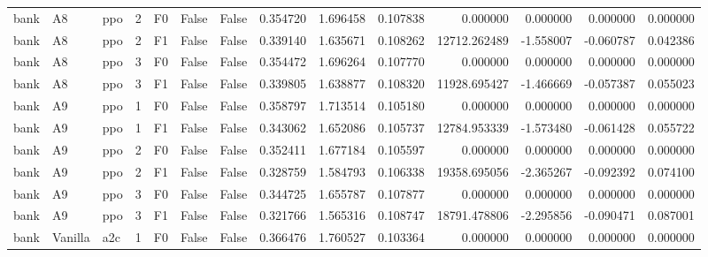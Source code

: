 \begin{tabular}{lllrlllrrrrrrr}
      bank &      A8 &       ppo &     2 &  F0 &           False &            False &  0.354720 &  1.696458 & 0.107838 &         0.000000 &           0.000000 &        0.000000 &            0.000000 \\
      bank &      A8 &       ppo &     2 &  F1 &           False &            False &  0.339140 &  1.635671 & 0.108262 &     12712.262489 &          -1.558007 &       -0.060787 &            0.042386 \\
      bank &      A8 &       ppo &     3 &  F0 &           False &            False &  0.354472 &  1.696264 & 0.107770 &         0.000000 &           0.000000 &        0.000000 &            0.000000 \\
      bank &      A8 &       ppo &     3 &  F1 &           False &            False &  0.339805 &  1.638877 & 0.108320 &     11928.695427 &          -1.466669 &       -0.057387 &            0.055023 \\
      bank &      A9 &       ppo &     1 &  F0 &           False &            False &  0.358797 &  1.713514 & 0.105180 &         0.000000 &           0.000000 &        0.000000 &            0.000000 \\
      bank &      A9 &       ppo &     1 &  F1 &           False &            False &  0.343062 &  1.652086 & 0.105737 &     12784.953339 &          -1.573480 &       -0.061428 &            0.055722 \\
      bank &      A9 &       ppo &     2 &  F0 &           False &            False &  0.352411 &  1.677184 & 0.105597 &         0.000000 &           0.000000 &        0.000000 &            0.000000 \\
      bank &      A9 &       ppo &     2 &  F1 &           False &            False &  0.328759 &  1.584793 & 0.106338 &     19358.695056 &          -2.365267 &       -0.092392 &            0.074100 \\
      bank &      A9 &       ppo &     3 &  F0 &           False &            False &  0.344725 &  1.655787 & 0.107877 &         0.000000 &           0.000000 &        0.000000 &            0.000000 \\
      bank &      A9 &       ppo &     3 &  F1 &           False &            False &  0.321766 &  1.565316 & 0.108747 &     18791.478806 &          -2.295856 &       -0.090471 &            0.087001 \\
      bank & Vanilla &       a2c &     1 &  F0 &           False &            False &  0.366476 &  1.760527 & 0.103364 &         0.000000 &           0.000000 &        0.000000 &            0.000000 \\

\end{tabular}
